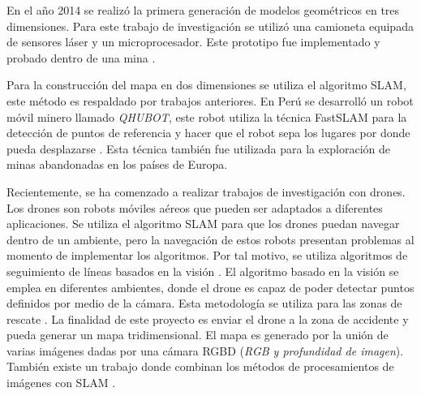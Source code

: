 En el año 2014 se realizó la primera generación de modelos geométricos en tres
dimensiones. Para este trabajo de investigación se utilizó una camioneta equipada de 
sensores láser y un microprocesador. Este prototipo fue implementado y probado dentro 
de una mina \cite{Zlot2014}.

Para la construcción del mapa en dos dimensiones se utiliza el algoritmo SLAM, este 
método es respaldado por trabajos anteriores. En Perú se desarrolló un robot móvil minero
llamado \textit{QHUBOT}, este robot utiliza la técnica FastSLAM para la detección de puntos
de referencia y hacer que el robot sepa los lugares por donde pueda desplazarse 
\cite{Mauricio2015}. Esta técnica también fue utilizada para la exploración de minas 
abandonadas en los países de Europa.


Recientemente, se ha comenzado a realizar trabajos de investigación con drones. Los drones 
son robots móviles aéreos que pueden ser adaptados a diferentes aplicaciones. Se utiliza 
el algoritmo SLAM para que los drones puedan navegar dentro de un ambiente, pero la navegación
de estos robots presentan problemas al momento de implementar los algoritmos. Por tal motivo,
se utiliza algoritmos de seguimiento de líneas basados en la visión \cite{Verschoor2013}. El
algoritmo basado en la visión se emplea en diferentes ambientes, donde el drone es capaz de 
poder detectar puntos definidos por medio de la cámara. Esta metodología se utiliza para
las zonas de rescate \cite{Skoda2015}. La finalidad de este proyecto es enviar el drone a la
zona de accidente y pueda generar un mapa tridimensional. El mapa es generado por la unión de
varias imágenes dadas por una cámara RGBD (\textit{RGB y profundidad de imagen}). También existe
un trabajo donde combinan los métodos de procesamientos de imágenes con SLAM \cite{Heukels2015}.

